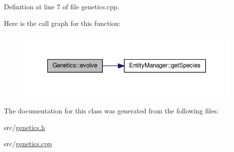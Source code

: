Definition at line 7 of file genetics.\-cpp.



Here is the call graph for this function\-:
\nopagebreak
\begin{figure}[H]
\begin{center}
\leavevmode
\includegraphics[width=340pt]{class_genetics_a63e33bd3725feb511e19d86e2d07ca3b_cgraph}
\end{center}
\end{figure}




The documentation for this class was generated from the following files\-:\begin{DoxyCompactItemize}
\item 
src/\hyperlink{genetics_8h}{genetics.\-h}\item 
src/\hyperlink{genetics_8cpp}{genetics.\-cpp}\end{DoxyCompactItemize}
